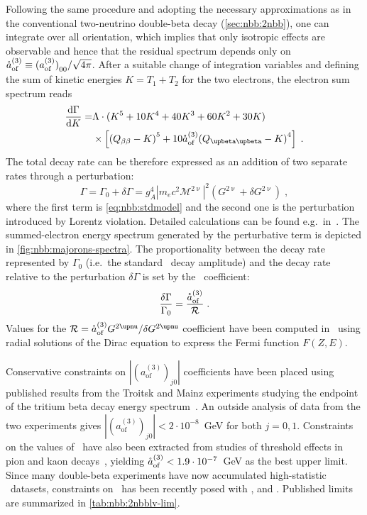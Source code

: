 Following the same procedure and adopting the necessary approximations as in the
conventional two-neutrino double-beta decay (\cref{sec:nbb:2nbb}), one can integrate over
all orientation, which implies that only isotropic effects are observable and hence that
the residual spectrum depends only on ${\mathring{a}_\text{of}^{(3)}} \equiv {{(a_\text{of}^{(3)})}_{00}}/\sqrt{4\pi}$. After a suitable
change of integration variables and defining the sum of kinetic energies $K=T_1+T_2$ for
the two electrons, the electron sum spectrum reads
\begin{equation}\label{eq:nbb:totwidth}
  \begin{split}
    \frac{\text{d}\Gamma}{\text{d}K} = &
      \Lambda \cdot (K^5 + 10K^4 + 40K^3 + 60K^2 + 30K) \\
      & \times\left[{(Q_{\beta\beta} - K)}^5 + 10 \aofM {(Q_{\upbeta\upbeta} - K)}^4\right] \;. \\
  \end{split}
\end{equation}
The total decay rate can be therefore expressed as an addition of two separate
rates through a perturbation:
\[
  \Gamma = \Gamma_0 + \delta\Gamma = g_A^4 |m_e c^2 \mathcal{M}^{2\upnu}|^2 (G^{2\upnu} +
  \delta G^{2\upnu}) \;,
\]
where the first term is \cref{eq:nbb:stdmodel} and the second one is the perturbation
introduced by Lorentz violation. Detailed calculations can be found
e.g.~in~\cite{Nitescu2020}. The summed-electron energy spectrum generated by the
perturbative term is depicted in \cref{fig:nbb:majorons-spectra}. The proportionality
between the decay rate represented by $\Gamma_0$ (i.e.~the standard \nnbb\ decay
amplitude) and the decay rate relative to the perturbation $\delta\Gamma$ is set by the
\aof\ coefficient:
\[
  \frac{\delta\Gamma}{\Gamma_0} = \frac{{\mathring{a}_\text{of}^{(3)}}}{\mathcal{R}} \;.
\]
Values for the $\mathcal{R}=\aofM G^{2\upnu} / \delta G^{2\upnu}$ coefficient have been
computed in~\cite{Nitescu2020} using radial solutions of the Dirac equation to express the
Fermi function $F(Z,E)$.

Conservative constraints on $|(a_\text{of}^{(3)})_{j0}|$ coefficients have been placed
using published results from the Troitsk and Mainz experiments studying the endpoint of
the tritium beta decay energy spectrum~\cite{Diaz2013}. An outside analysis of data from
the two experiments gives $|(a_\text{of}^{(3)})_{j0}| < 2 \cdot 10^{-8}$~GeV for both
$j=0,1$.  Constraints on the values of \aof\ have also been extracted from studies of
threshold effects in pion and kaon decays~\cite{Kostelecky2012}, yielding ${\mathring{a}_\text{of}^{(3)}} < 1.9
\cdot 10^{-7}$~GeV as the best upper limit.  Since many double-beta experiments have now
accumulated high-statistic \nnbb\ datasets, constraints on \aof\ has been recently posed
with ,  and . Published limits are summarized in
\cref{tab:nbb:2nbblv-lim}.


